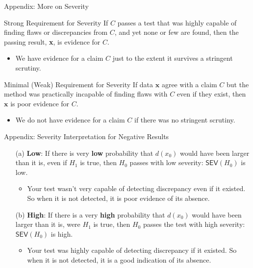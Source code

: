 \documentclass{beamer}
\begin{document}
\begin{frame}{Appendix: More on Severity}
\begin{block}{Strong Requirement for Severity}
If $C$ passes a test that was highly capable of finding flaws or discrepancies from $C$, and yet none or few are found, then the passing result, \textbf{x}, is evidence for $C$.
\end{block}
\begin{itemize}
\item We have evidence for a claim $C$ just to the extent it survives a stringent scrutiny.
\end{itemize}
\begin{block}{Minimal (Weak) Requirement for Severity}
If data $\textbf{x}$ agree with a claim $C$ but the method was practically incapable of finding flaws with $C$ even if they exist, then $\textbf{x}$ is poor evidence for $C$.
\end{block}
\begin{itemize}
\item We do not have evidence for a claim $C$ if there was no stringent scrutiny.
\end{itemize}

\end{frame}

\begin{frame}{Appendix: Severity Interpretation for Negative Results}
\begin{enumerate}
\item[(a)] \textbf{Low}: If there is very \textbf{low} probability that $d(x_{0})$ would have been larger than it is, even if $H_{1}$ is true, then $H_{0}$ passes with low severity: $\textsf{SEV}(H_{0})$ is low.
\begin{itemize}
\item Your test wasn't very capable of detecting discrepancy even if it existed. So when it is not detected, it is poor evidence of its absence.
\end{itemize}

\item[(b)] \textbf{High}: If there is a very \textbf{high} probability that $d(x_{0})$ would have been larger than it is, were $H_{1}$ is true, then $H_{0}$ passes the test with high severity: $\textsf{SEV}(H_{0})$ is high.

\begin{itemize}
\item Your test was highly capable of detecting discrepancy if it existed. So when it is not detected, it is a good indication of its absence.
\end{itemize}


\end{enumerate}

\end{frame}
\end{document}
